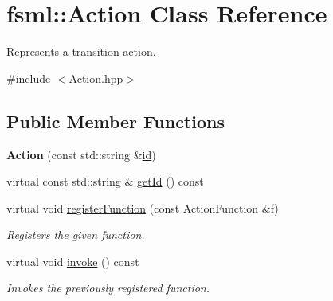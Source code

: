 \hypertarget{classfsml_1_1Action}{\section{fsml\-:\-:Action Class Reference}
\label{classfsml_1_1Action}
}


Represents a transition action.  




{\ttfamily \#include $<$Action.\-hpp$>$}

\subsection*{Public Member Functions}
\begin{DoxyCompactItemize}
\item 
\hypertarget{classfsml_1_1Action_aa2434deec70591006e204eb7fb0e97d7}{{\bfseries Action} (const std\-::string \&\hyperlink{classfsml_1_1Action_ab5da63bc94cdd0b4110c87fd3e4ee271}{id})}\label{classfsml_1_1Action_aa2434deec70591006e204eb7fb0e97d7}

\item 
virtual const std\-::string \& \hyperlink{classfsml_1_1Action_ab158f49a59dea6cf40ba08210dcd09cc}{get\-Id} () const 
\item 
virtual void \hyperlink{classfsml_1_1Action_ac41cfae7343d8b96fbd204451bee840f}{register\-Function} (const Action\-Function \&f)
\begin{DoxyCompactList}\small\item\em Registers the given function. \end{DoxyCompactList}\item 
virtual void \hyperlink{classfsml_1_1Action_ae5b8ae5409ea58bed119bc860a803897}{invoke} () const 
\begin{DoxyCompactList}\small\item\em Invokes the previously registered function. \end{DoxyCompactList}\end{DoxyCompactItemize}

